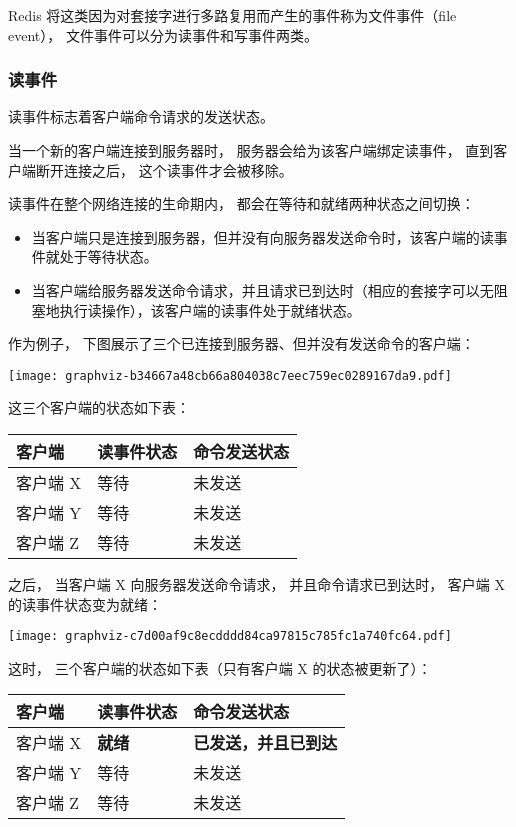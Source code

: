 \documentclass[a4paper,11pt,english]{sphinxmanual}
\begin{document}
Redis 将这类因为对套接字进行多路复用而产生的事件称为文件事件（file event），
文件事件可以分为读事件和写事件两类。


\subsubsection{读事件}
\label{internal/ae:id3}
读事件标志着客户端命令请求的发送状态。

当一个新的客户端连接到服务器时，
服务器会给为该客户端绑定读事件，
直到客户端断开连接之后，
这个读事件才会被移除。

读事件在整个网络连接的生命期内，
都会在等待和就绪两种状态之间切换：
\begin{itemize}
\item {} 
当客户端只是连接到服务器，但并没有向服务器发送命令时，该客户端的读事件就处于等待状态。

\item {} 
当客户端给服务器发送命令请求，并且请求已到达时（相应的套接字可以无阻塞地执行读操作），该客户端的读事件处于就绪状态。

\end{itemize}

作为例子，
下图展示了三个已连接到服务器、但并没有发送命令的客户端：

\texttt{[image: graphviz-b34667a48cb66a804038c7eec759ec0289167da9.pdf]}

这三个客户端的状态如下表：

\begin{tabulary}{\linewidth}{|L|L|L|}
\hline

客户端
 & 
读事件状态
 & 
命令发送状态
\\\hline

客户端 X
 & 
等待
 & 
未发送
\\\hline

客户端 Y
 & 
等待
 & 
未发送
\\\hline

客户端 Z
 & 
等待
 & 
未发送
\\\hline
\end{tabulary}


之后，
当客户端 X 向服务器发送命令请求，
并且命令请求已到达时，
客户端 X 的读事件状态变为就绪：

\texttt{[image: graphviz-c7d00af9c8ecdddd84ca97815c785fc1a740fc64.pdf]}

这时，
三个客户端的状态如下表（只有客户端 X 的状态被更新了）：

\begin{tabulary}{\linewidth}{|L|L|L|}
\hline

客户端
 & 
读事件状态
 & 
命令发送状态
\\\hline

客户端 X
 & 
\textbf{就绪}
 & 
\textbf{已发送，并且已到达}
\\\hline

客户端 Y
 & 
等待
 & 
未发送
\\\hline

客户端 Z
 & 
等待
 & 
未发送
\\\hline
\end{tabulary}
\end{document}
